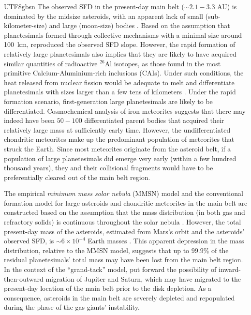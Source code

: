 \documentclass[tighten]{aastex6}
\begin{document}
\begin{CJK*}{UTF8}{gbsn}
The observed SFD in the present-day main belt ($\sim 2.1-3.3$ AU) 
is dominated by the midsize asteroids, with an apparent lack of small 
(sub-kilometer-size) and large (moon-size) bodies \citep{bottke2005}.  
Based on the assumption that planetesimals formed through 
collective mechanisms \citep{johansen2007, cuzzi2008} with 
a minimal size around 100~km, \cite{morbidelli2009}
reproduced the observed SFD slope.  However, the rapid 
formation of relatively large planetesimals also implies 
that they are likely to have acquired similar quantities 
of radioactive $^{26}$Al isotopes, as those found in the most 
primitive Calcium-Aluminium-rich inclusions (CAIs). Under such 
conditions, the heat released from nuclear fission would be adequate 
to melt and differentiate planetesimals with sizes larger than a 
few tens of kilometers \citep{mcsween1999}. Under the rapid formation scenario, 
first-generation large planetesimals are likely to be differentiated.
Cosmochemical analysis of iron meteorites \citep{kelley2000}
suggests that there may indeed have been $50-100$ differentiated parent bodies 
that acquired their relatively large mass at sufficiently early time.
However, the undifferentiated chondritic meteorites make up the 
predominant population of meteorites that struck the Earth. 
Since most meteorites originate from the asteroid belt, if a 
population of large planetesimals did emerge very early (within
a few hundred thousand years), they and their collisional 
fragments would have to be preferentially cleared out of the 
main belt region.

The empirical \emph{minimum mass solar nebula} (MMSN) model 
\citep{hayashi1981, weidenschilling1997} and the conventional 
formation model for large asteroids and chondritic meteorites 
in the main belt are constructed based on the assumption that the 
mass distribution (in both gas and refractory solids) is continuous 
throughout the solar nebula \citep{wetherill1989, connolly1998, 
ciesla2002, desch2002, johansen2007}. However, the total
present-day mass of the asteroids, estimated from Mars's orbit 
and the asteroids' observed SFD, is $\sim 6 \times 10^{-4}$ 
Earth masses \citep{morbidelli2009}. This apparent depression in the mass
distribution, relative to the MMSN
model, suggests that up to $99.9\%$ of the residual planetesimals'
total mass may have been lost from the main belt region. In the 
context of the ``grand-tack'' model, \citet{walsh2011} put forward 
the possibility of inward-then-outward migration of Jupiter and Saturn, 
which may have migrated to the present-day location of the main 
belt prior to the disk depletion. As a consequence, asteroids in the 
main belt are severely depleted and repopulated during the phase 
of the gas giants' instability. 



\end{CJK*}
\end{document}
